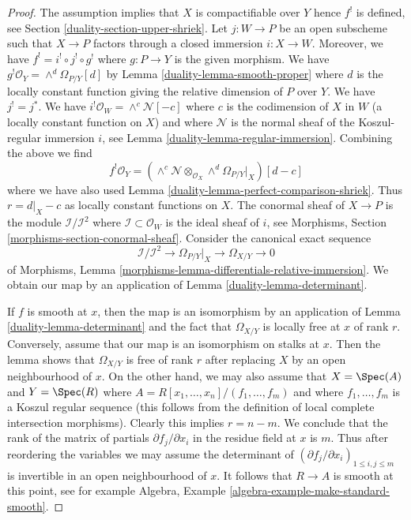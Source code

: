 \begin{proof}

The assumption implies that $X$ is compactifiable over $Y$ hence $f^!$
is defined, see Section \ref{duality-section-upper-shriek}.
Let $j : W \to P$ be an open subscheme such that
$X \to P$ factors through a closed immersion $i : X \to W$.
Moreover, we have $f^! = i^! \circ j^! \circ g^!$ where
$g : P \to Y$ is the given morphism.
We have $g^!\mathcal{O}_Y = \wedge^d\Omega_{P/Y}[d]$ by
Lemma \ref{duality-lemma-smooth-proper} where $d$ is the locally
constant function giving the relative dimension of $P$ over $Y$.
We have $j^! = j^*$. We have $i^!\mathcal{O}_W = \wedge^c\mathcal{N}[-c]$
where $c$ is the codimension of $X$ in $W$ (a locally constant
function on $X$) and where $\mathcal{N}$ is the normal sheaf of
the Koszul-regular immersion $i$, see Lemma \ref{duality-lemma-regular-immersion}.
Combining the above we find
$$
f^!\mathcal{O}_Y =
\left(\wedge^c\mathcal{N} \otimes_{\mathcal{O}_X}
\wedge^d\Omega_{P/Y}|_X\right)[d - c]
$$
where we have also used Lemma \ref{duality-lemma-perfect-comparison-shriek}.
Thus $r = d|_X - c$ as locally constant functions on $X$.
The conormal sheaf of $X \to P$ is the module
$\mathcal{I}/\mathcal{I}^2$ where $\mathcal{I} \subset \mathcal{O}_W$
is the ideal sheaf of $i$, see
Morphisms, Section \ref{morphisms-section-conormal-sheaf}.
Consider the canonical exact sequence
$$
\mathcal{I}/\mathcal{I}^2 \to
\Omega_{P/Y}|_X \to \Omega_{X/Y} \to 0
$$
of Morphisms, Lemma \ref{morphisms-lemma-differentials-relative-immersion}.
We obtain our map by an application of Lemma \ref{duality-lemma-determinant}.

\medskip\noindent
If $f$ is smooth at $x$, then the map is an isomorphism by an application of
Lemma \ref{duality-lemma-determinant}
and the fact that $\Omega_{X/Y}$ is locally free at $x$
of rank $r$. Conversely, assume that our map is an isomorphism on stalks
at $x$. Then the lemma shows that $\Omega_{X/Y}$ is free of rank $r$
after replacing $X$ by an open neighbourhood of $x$.
On the other hand, we may also assume that $X = \Spec(A)$ and
$Y = \Spec(R)$ where $A = R[x_1, \ldots, x_n]/(f_1, \ldots, f_m)$
and where $f_1, \ldots, f_m$ is a Koszul regular sequence
(this follows from the definition of local complete intersection morphisms).
Clearly this implies $r = n - m$. We conclude that the rank of the matrix
of partials $\partial f_j/\partial x_i$ in the residue field at $x$ is $m$.
Thus after reordering the variables we may assume
the determinant of $(\partial f_j/\partial x_i)_{1 \leq i, j \leq m}$
is invertible in an open neighbourhood of $x$. It follows
that $R \to A$ is smooth at this point, see for example
Algebra, Example \ref{algebra-example-make-standard-smooth}.
\end{proof}

